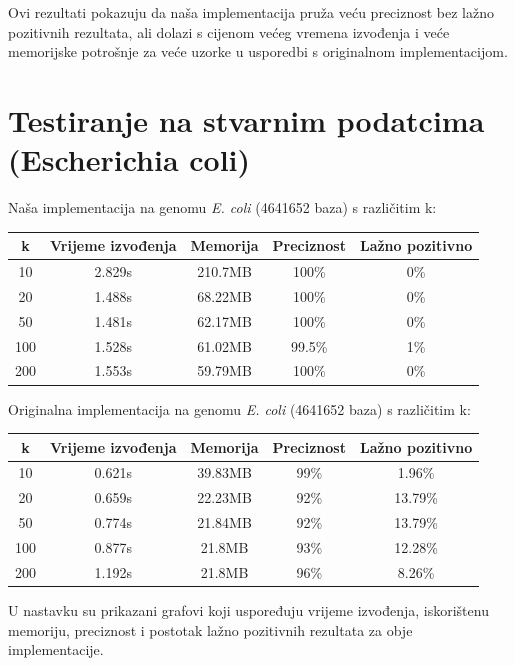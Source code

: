 \documentclass[seminarskirad]{fer}
\begin{document}
Ovi rezultati pokazuju da naša implementacija pruža veću preciznost bez lažno pozitivnih rezultata, ali dolazi s cijenom većeg vremena izvođenja i veće memorijske potrošnje za veće uzorke u usporedbi s originalnom implementacijom.


\section{Testiranje na stvarnim podatcima (Escherichia coli)}
Naša implementacija na genomu \textit{E. coli} (4641652 baza) s različitim k:

\begin{center}
	\small
	\begin{tabular}{||c c c c c||} 
		\hline
		k & Vrijeme izvođenja & Memorija & Preciznost & Lažno pozitivno \\ [0.5ex] 
		\hline\hline
		10 & 2.829s & 210.7MB & 100\% & 0\% \\ 
		\hline
		20 & 1.488s & 68.22MB & 100\% & 0\% \\
		\hline
		50 & 1.481s & 62.17MB & 100\% & 0\% \\
		\hline
		100 & 1.528s & 61.02MB & 99.5\% & 1\% \\
		\hline
		200 & 1.553s & 59.79MB & 100\% & 0\% \\ [1ex] 
		\hline
	\end{tabular}
\end{center}

Originalna implementacija na genomu \textit{E. coli} (4641652 baza) s različitim k:

\begin{center}
	\small
	\begin{tabular}{||c c c c c||} 
		\hline
		k & Vrijeme izvođenja & Memorija & Preciznost & Lažno pozitivno \\ [0.5ex] 
		\hline\hline
		10 & 0.621s & 39.83MB & 99\% & 1.96\% \\ 
		\hline
		20 & 0.659s & 22.23MB & 92\% & 13.79\% \\
		\hline
		50 & 0.774s & 21.84MB & 92\% & 13.79\% \\
		\hline
		100 & 0.877s & 21.8MB & 93\% & 12.28\% \\
		\hline
		200 & 1.192s & 21.8MB & 96\% & 8.26\% \\ [1ex] 
		\hline
	\end{tabular}
\end{center}

U nastavku su prikazani grafovi koji uspoređuju vrijeme izvođenja, iskorištenu memoriju, preciznost i postotak lažno pozitivnih rezultata za obje implementacije.
\end{document}
